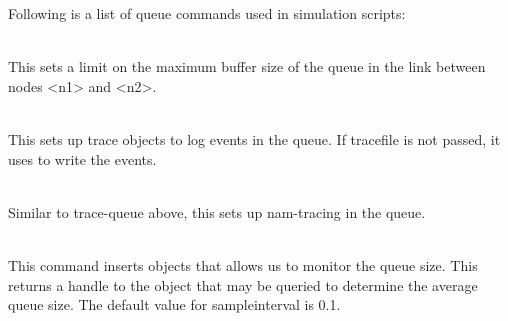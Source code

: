 Following is a list of queue commands used in simulation scripts:
\begin{flushleft}
\\
This sets a limit on the maximum buffer size of the queue in the link between
nodes <n1> and <n2>.


\\
This sets up trace objects to log events in the queue. If tracefile is not
passed, it uses  to write the events.


\\
Similar to trace-queue above, this sets up nam-tracing in the queue.


\\
This command inserts objects that allows us to monitor the queue size. This
returns a handle to the object that may be queried to determine the average
queue size. The default value for sampleinterval is 0.1.


\end{flushleft}

\endinput
